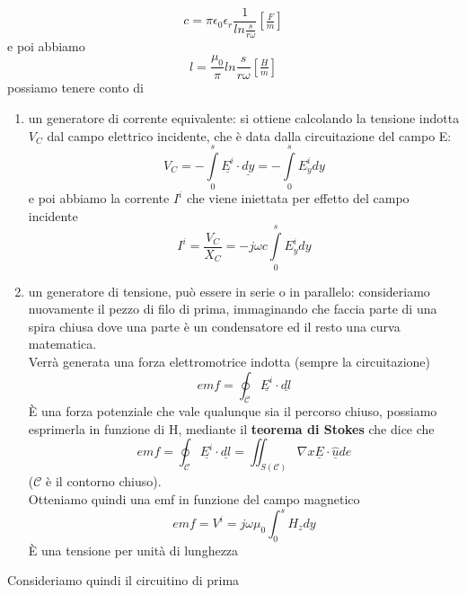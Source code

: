 \documentclass[oneside, 12pt]{extbook}
\begin{document}
\begin{equation}
	c = \pi \epsilon_0 \epsilon_r \frac{1}{ln \frac{s}{r\omega}} [\tfrac{F}{m}]
\end{equation}
e poi abbiamo 
\begin{equation}
	l = \frac{\mu_0}{\pi} ln \frac{s}{r\omega} [\tfrac{H}{m}]
\end{equation}
possiamo tenere conto di
\begin{enumerate}
	\item un generatore di corrente equivalente: si ottiene calcolando la tensione indotta $V_C$ dal campo elettrico incidente, che è data dalla circuitazione del campo E:
	\begin{equation}
		V_C = -\int\limits_{0}^{s} \underline{E^i} \cdot \underline{dy} = -\int\limits_{0}^{s} E_y^i dy
	\end{equation}
	e poi abbiamo la corrente $I^i$ che viene iniettata per effetto del campo incidente
	\begin{equation}
		I^i = \frac{V_C}{X_C} = -j\omega c \int\limits_{0}^{s} E_y^i dy
	\end{equation}
	\item un generatore di tensione, può essere in serie o in parallelo: consideriamo nuovamente il pezzo di filo di prima, immaginando che faccia parte di una spira chiusa dove una parte è un condensatore ed il resto una curva matematica.\\Verrà generata una forza elettromotrice indotta (sempre la circuitazione) 
	\begin{equation}
		emf = \oint_{\mathscr{C}} \underline{E^i} \cdot \underline{dl}	
	\end{equation}
	È una forza potenziale che vale qualunque sia il percorso chiuso, possiamo esprimerla in funzione di H, mediante il \textbf{teorema di Stokes} che dice che
	\begin{equation}
		emf = \oint_{\mathscr{C}} \underline{E^i} \cdot \underline{dl} = \iint_{S(\mathscr{C})} \nabla x \underline{E} \cdot \underline{\hat{u}} de
	\end{equation}
	 ($\mathscr{C}$ è il contorno chiuso).\\Otteniamo quindi una emf in funzione del campo magnetico 
	 \begin{equation}
	 	emf = V^i = j\omega \mu_0 \int_{0}^{s} H_z dy
	 \end{equation}
	 È una tensione per unità di lunghezza
\end{enumerate}
Consideriamo quindi il circuitino di prima\\
\end{document}
